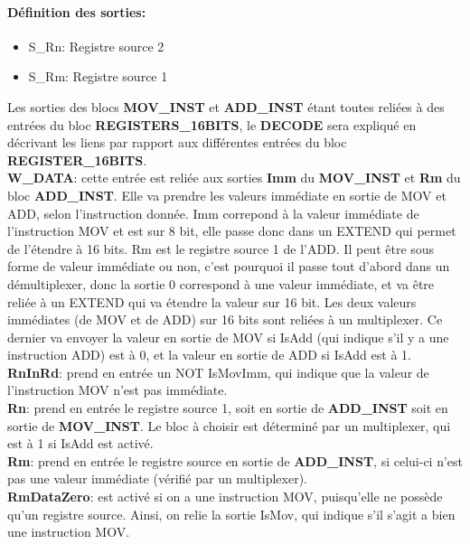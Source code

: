 \documentclass[a4paper]{article} %
\begin{document}
\paragraph{Définition des sorties:}
\begin{itemize}
    \item     S\_Rn: Registre source 2
    \item     S\_Rm: Registre source 1
\end{itemize}
\medskip
Les sorties des blocs \textbf{MOV\_INST} et \textbf{ADD\_INST} étant toutes reliées à des entrées du bloc \textbf{REGISTERS\_16BITS}, le \textbf{DECODE} sera expliqué en décrivant les liens par rapport aux différentes entrées du bloc \textbf{REGISTER\_16BITS}. \medskip \\
\textbf{W\_DATA}: cette entrée est reliée aux sorties \textbf{Imm} du \textbf{MOV\_INST} et \textbf{Rm} du bloc \textbf{ADD\_INST}. Elle va prendre les valeurs immédiate en sortie de MOV et ADD, selon l'instruction donnée. Imm correpond à la valeur immédiate de l'instruction MOV et est sur 8 bit, elle passe donc dans un EXTEND qui permet de l'étendre à 16 bits. Rm est le registre source 1 de l'ADD. Il peut être sous forme de valeur immédiate ou non, c'est pourquoi il passe tout d'abord dans un démultiplexer, donc la sortie 0 correspond à une valeur immédiate, et va être reliée à un EXTEND qui va étendre la valeur sur 16 bit. Les deux valeurs immédiates (de MOV et de ADD) sur 16 bits sont reliées à un multiplexer. Ce dernier va envoyer la valeur en sortie de MOV si IsAdd (qui indique s'il y a une instruction ADD) est à 0, et la valeur en sortie de ADD si IsAdd est à 1. \medskip \\
\textbf{RnInRd}: prend en entrée un NOT IsMovImm, qui indique que la valeur de l'instruction MOV n'est pas immédiate.\medskip \\
\textbf{Rn}: prend en entrée le registre source 1, soit en sortie de \textbf{ADD\_INST} soit en sortie de \textbf{MOV\_INST}. Le bloc à choisir est déterminé par un multiplexer, qui est à 1 si IsAdd est activé.\medskip \\
\textbf{Rm}: prend en entrée le registre source en sortie de \textbf{ADD\_INST}, si celui-ci n'est pas une valeur immédiate (vérifié par un multiplexer).
\medskip \\
\textbf{RmDataZero}: est activé si on a une instruction MOV, puisqu'elle ne possède qu'un registre source. Ainsi, on relie la sortie IsMov, qui indique s'il s'agit a bien une instruction MOV.
\medskip \\
\end{document}
